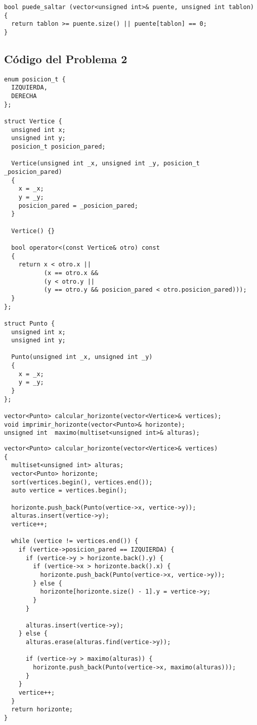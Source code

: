 \documentclass[a4paper]{article}
\begin{document}
\vspace*{0.5cm}

\begin{lstlisting}
bool puede_saltar (vector<unsigned int>& puente, unsigned int tablon) {
  return tablon >= puente.size() || puente[tablon] == 0;
}
\end{lstlisting}

\newpage

\subsection{Código del Problema 2}



\begin{lstlisting}
enum posicion_t {
  IZQUIERDA,
  DERECHA
};

struct Vertice {
  unsigned int x;
  unsigned int y;
  posicion_t posicion_pared;

  Vertice(unsigned int _x, unsigned int _y, posicion_t _posicion_pared)
  {
    x = _x;
    y = _y;
    posicion_pared = _posicion_pared;
  }

  Vertice() {}

  bool operator<(const Vertice& otro) const
  {
    return x < otro.x ||
           (x == otro.x &&
           (y < otro.y ||
           (y == otro.y && posicion_pared < otro.posicion_pared)));
  }
};

struct Punto {
  unsigned int x;
  unsigned int y;

  Punto(unsigned int _x, unsigned int _y)
  {
    x = _x;
    y = _y;
  }
};

vector<Punto> calcular_horizonte(vector<Vertice>& vertices);
void imprimir_horizonte(vector<Punto>& horizonte);
unsigned int  maximo(multiset<unsigned int>& alturas);
\end{lstlisting}

\newpage

\begin{lstlisting}
vector<Punto> calcular_horizonte(vector<Vertice>& vertices)
{
  multiset<unsigned int> alturas;
  vector<Punto> horizonte;
  sort(vertices.begin(), vertices.end());
  auto vertice = vertices.begin();

  horizonte.push_back(Punto(vertice->x, vertice->y));
  alturas.insert(vertice->y);
  vertice++;

  while (vertice != vertices.end()) {
    if (vertice->posicion_pared == IZQUIERDA) {
      if (vertice->y > horizonte.back().y) {
        if (vertice->x > horizonte.back().x) {
          horizonte.push_back(Punto(vertice->x, vertice->y));
        } else {
          horizonte[horizonte.size() - 1].y = vertice->y;
        }
      }

      alturas.insert(vertice->y);
    } else {
      alturas.erase(alturas.find(vertice->y));

      if (vertice->y > maximo(alturas)) {
        horizonte.push_back(Punto(vertice->x, maximo(alturas)));
      }
    }
    vertice++;
  }
  return horizonte;
}
\end{lstlisting}
\end{document}
